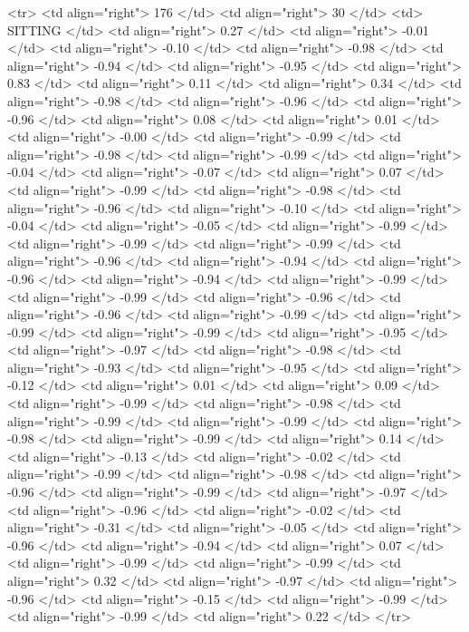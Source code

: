   <tr> <td align="right"> 176 </td> <td align="right">  30 </td> <td> SITTING </td> <td align="right"> 0.27 </td> <td align="right"> -0.01 </td> <td align="right"> -0.10 </td> <td align="right"> -0.98 </td> <td align="right"> -0.94 </td> <td align="right"> -0.95 </td> <td align="right"> 0.83 </td> <td align="right"> 0.11 </td> <td align="right"> 0.34 </td> <td align="right"> -0.98 </td> <td align="right"> -0.96 </td> <td align="right"> -0.96 </td> <td align="right"> 0.08 </td> <td align="right"> 0.01 </td> <td align="right"> -0.00 </td> <td align="right"> -0.99 </td> <td align="right"> -0.98 </td> <td align="right"> -0.99 </td> <td align="right"> -0.04 </td> <td align="right"> -0.07 </td> <td align="right"> 0.07 </td> <td align="right"> -0.99 </td> <td align="right"> -0.98 </td> <td align="right"> -0.96 </td> <td align="right"> -0.10 </td> <td align="right"> -0.04 </td> <td align="right"> -0.05 </td> <td align="right"> -0.99 </td> <td align="right"> -0.99 </td> <td align="right"> -0.99 </td> <td align="right"> -0.96 </td> <td align="right"> -0.94 </td> <td align="right"> -0.96 </td> <td align="right"> -0.94 </td> <td align="right"> -0.99 </td> <td align="right"> -0.99 </td> <td align="right"> -0.96 </td> <td align="right"> -0.96 </td> <td align="right"> -0.99 </td> <td align="right"> -0.99 </td> <td align="right"> -0.99 </td> <td align="right"> -0.95 </td> <td align="right"> -0.97 </td> <td align="right"> -0.98 </td> <td align="right"> -0.93 </td> <td align="right"> -0.95 </td> <td align="right"> -0.12 </td> <td align="right"> 0.01 </td> <td align="right"> 0.09 </td> <td align="right"> -0.99 </td> <td align="right"> -0.98 </td> <td align="right"> -0.99 </td> <td align="right"> -0.99 </td> <td align="right"> -0.98 </td> <td align="right"> -0.99 </td> <td align="right"> 0.14 </td> <td align="right"> -0.13 </td> <td align="right"> -0.02 </td> <td align="right"> -0.99 </td> <td align="right"> -0.98 </td> <td align="right"> -0.96 </td> <td align="right"> -0.99 </td> <td align="right"> -0.97 </td> <td align="right"> -0.96 </td> <td align="right"> -0.02 </td> <td align="right"> -0.31 </td> <td align="right"> -0.05 </td> <td align="right"> -0.96 </td> <td align="right"> -0.94 </td> <td align="right"> 0.07 </td> <td align="right"> -0.99 </td> <td align="right"> -0.99 </td> <td align="right"> 0.32 </td> <td align="right"> -0.97 </td> <td align="right"> -0.96 </td> <td align="right"> -0.15 </td> <td align="right"> -0.99 </td> <td align="right"> -0.99 </td> <td align="right"> 0.22 </td> </tr>
